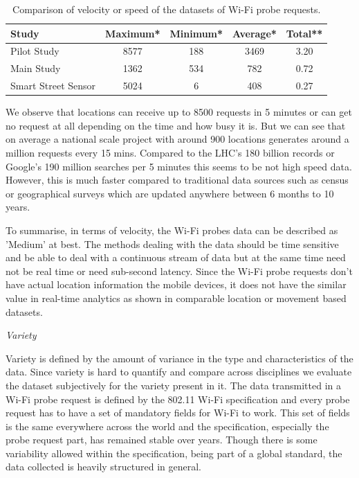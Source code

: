 \begin{table}[h]
  \footnotesize
  \begin{center}
    \begin{tabular}{lcccc}
      \toprule
      Study & Maximum* & Minimum* & Average* & Total** \\
      \midrule
      Pilot Study & 8577 & 188 & 3469 & 3.20 \\
      Main Study & 1362 & 534 & 782 & 0.72 \\
      Smart Street Sensor & 5024 & 6 & 408 & 0.27 \\
      \bottomrule
    \end{tabular}
  \end{center}
  \caption{Comparison of velocity or speed of the datasets of Wi-Fi probe requests.}
  \label{table:toolkit:velocity}
\end{table}


We observe that locations can receive up to 8500 requests in 5 minutes or can get no request at all depending on the time and how busy it is.
But we can see that on average a national scale project with around 900 locations generates around a million requests every 15 mins. 
Compared to the LHC's 180 billion records or Google's 190 million searches per 5 minutes this seems to be not high speed data.
However, this is much faster compared to traditional data sources such as census or geographical surveys which are updated anywhere between 6 months to 10 years.

To summarise, in terms of velocity, the Wi-Fi probes data can be described as 'Medium' at best. 
The methods dealing with the data should be time sensitive and be able to deal with a continuous stream of data but at the same time need not be real time or need sub-second latency.
Since the Wi-Fi probe requests don't have actual location information the mobile devices, it does not have the similar value in real-time analytics as shown in comparable location or movement based datasets.


\vspace{1.5em}\noindent\textit{Variety}\vspace{0.5em}

Variety is defined by the amount of variance in the type and characteristics of the data.
Since variety is hard to quantify and compare across disciplines we evaluate the dataset subjectively for the variety present in it.
The data transmitted in a Wi-Fi probe request is defined by the 802.11 Wi-Fi specification \cite{ieee2016} and every probe request has to have a set of mandatory fields for Wi-Fi to work.
This set of fields is the same everywhere across the world and the specification, especially the probe request part, has remained stable over years.
Though there is some variability allowed within the specification, being part of a global standard, the data collected is heavily structured in general.

